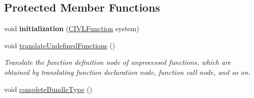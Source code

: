 \subsection*{Protected Member Functions}
\begin{DoxyCompactItemize}
\item 
\hypertarget{classedu_1_1udel_1_1cis_1_1vsl_1_1civl_1_1model_1_1common_1_1ModelBuilderWorker_ae1b03d4c98fe03db72773bcecc5d08f3}{}void {\bfseries initialization} (\hyperlink{interfaceedu_1_1udel_1_1cis_1_1vsl_1_1civl_1_1model_1_1IF_1_1CIVLFunction}{C\+I\+V\+L\+Function} system)\label{classedu_1_1udel_1_1cis_1_1vsl_1_1civl_1_1model_1_1common_1_1ModelBuilderWorker_ae1b03d4c98fe03db72773bcecc5d08f3}

\item 
\hypertarget{classedu_1_1udel_1_1cis_1_1vsl_1_1civl_1_1model_1_1common_1_1ModelBuilderWorker_a389636256ca2a7c2ab41c83df0f1d4aa}{}void \hyperlink{classedu_1_1udel_1_1cis_1_1vsl_1_1civl_1_1model_1_1common_1_1ModelBuilderWorker_a389636256ca2a7c2ab41c83df0f1d4aa}{translate\+Undefined\+Functions} ()\label{classedu_1_1udel_1_1cis_1_1vsl_1_1civl_1_1model_1_1common_1_1ModelBuilderWorker_a389636256ca2a7c2ab41c83df0f1d4aa}

\begin{DoxyCompactList}\small\item\em Translate the function definition node of unprocessed functions, which are obtained by translating function declaration node, function call node, and so on. \end{DoxyCompactList}\item 
\hypertarget{classedu_1_1udel_1_1cis_1_1vsl_1_1civl_1_1model_1_1common_1_1ModelBuilderWorker_a4f2ad498ff7904aa6fce93ba6ca78409}{}void \hyperlink{classedu_1_1udel_1_1cis_1_1vsl_1_1civl_1_1model_1_1common_1_1ModelBuilderWorker_a4f2ad498ff7904aa6fce93ba6ca78409}{complete\+Bundle\+Type} ()\label{classedu_1_1udel_1_1cis_1_1vsl_1_1civl_1_1model_1_1common_1_1ModelBuilderWorker_a4f2ad498ff7904aa6fce93ba6ca78409}


\end{DoxyCompactItemize}
